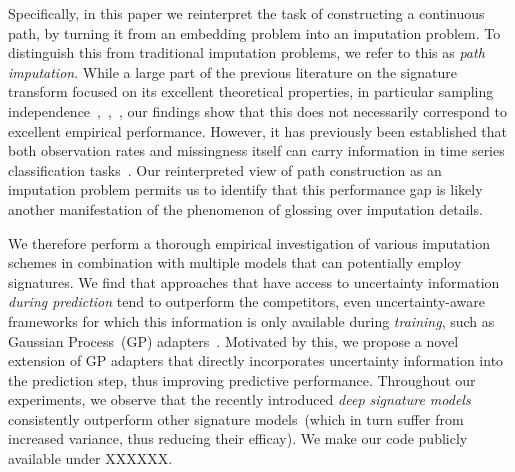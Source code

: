 \documentclass{article}
\begin{document}
Specifically, in this paper we reinterpret the task of
constructing a continuous path, by turning it from an embedding problem
into an imputation problem. To distinguish this from traditional
imputation problems, we refer to this as \emph{path imputation}.
%
While a large part of the previous literature on the signature transform
focused on its excellent theoretical properties, in particular sampling
independence~\cite[Proposition A.7]{kidger2019deep},~\cite{signatorydocumentation},~\cite[Section 2]{toth2019gp}, our findings show that this does not
necessarily correspond to excellent empirical performance.
%
However, it has previously been established that both observation rates
and missingness itself can carry information in time series
classification tasks~\citep{rubin1976inference, gelman2007dataanalysis}.
%
Our reinterpreted view of path construction as an imputation problem
permits us to identify that this performance gap is likely another
manifestation of the phenomenon of glossing over imputation details.

We therefore perform a thorough empirical investigation of various
imputation schemes in combination with multiple models that can potentially
employ signatures. We find that approaches that have access to
uncertainty information \emph{during prediction} tend to outperform the
competitors, even uncertainty-aware frameworks for which this
information is only available during \emph{training}, such as Gaussian
Process~(GP) adapters~\citep{li2016scalable, futoma2017mgp}.
%
Motivated by this, we propose a novel extension of GP adapters that
directly incorporates uncertainty information into the prediction step,
thus improving predictive performance.
Throughout our experiments, we observe that the recently introduced
\emph{deep signature models}~\citep{kidger2019deep} consistently
outperform other signature models~(which in turn suffer from increased
variance, thus reducing their efficay).
%
We make our code publicly available under XXXXXX.

\end{document}
